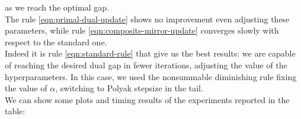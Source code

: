 \documentclass[notitlepage]{article}
\begin{document}
as we reach the optimal gap.\\
The rule \eqref{eqn:primal-dual-update} shows no improvement even adjusting these parameters, while rule \eqref{eqn:composite-mirror-update} converges slowly with respect to the standard one.\\
Indeed it is rule \eqref{eqn:standard-rule} that give us the best results: we are capable of reaching the desired dual gap in fewer iterations, adjusting the value of the hyperparameters. In this case, we used the nonsummable diminishing rule 
fixing the value of $\alpha$, switching to Polyak stepsize in the tail.\\
We can show some plots and timing results of the experiments reported in the table:




\end{document}
